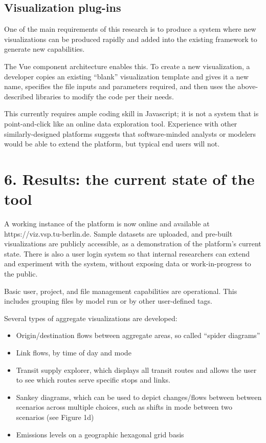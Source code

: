 \hypertarget{visualization-plug-ins}{%
\subsection{Visualization plug-ins}\label{visualization-plug-ins}}

One of the main requirements of this research is to produce a system where new visualizations can be produced rapidly and added into the existing framework to generate new capabilities.

The Vue component architecture enables this. To create a new visualization, a developer copies an existing ``blank'' visualization template and gives it a new name, specifies the file inputs and parameters required, and then uses the above-described libraries to modify the code per their needs.

This currently requires ample coding skill in Javascript; it is not a system that is point-and-click like an online data exploration tool. Experience with other similarly-designed platforms suggests that software-minded analysts or modelers would be able to extend the platform, but typical end users will not.

\hypertarget{results-the-current-state-of-the-tool}{%
\section{6. Results: the current state of the tool}\label{results-the-current-state-of-the-tool}}

A working instance of the platform is now online and available at https://viz.vsp.tu-berlin.de. Sample datasets are uploaded, and pre-built visualizations are publicly accessible, as a demonstration of the platform's current state. There is also a user login system so that internal researchers can extend and experiment with the system, without exposing data or work-in-progress to the public.

Basic user, project, and file management capabilities are operational. This includes grouping files by model run or by other user-defined tags.

Several types of aggregate visualizations are developed:

\begin{itemize}
\tightlist
\item
  Origin/destination flows between aggregate areas, so called ``spider
  diagrams''
\item
  Link flows, by time of day and mode
\item
  Transit supply explorer, which displays all transit routes and allows
  the user to see which routes serve specific stops and links.
\item
  Sankey diagrams, which can be used to depict changes/flows between
  between scenarios across multiple choices, such as shifts in mode
  between two scenarios (see Figure 1d)
\item
  Emissions levels on a geographic hexagonal grid basis
\end{itemize}

